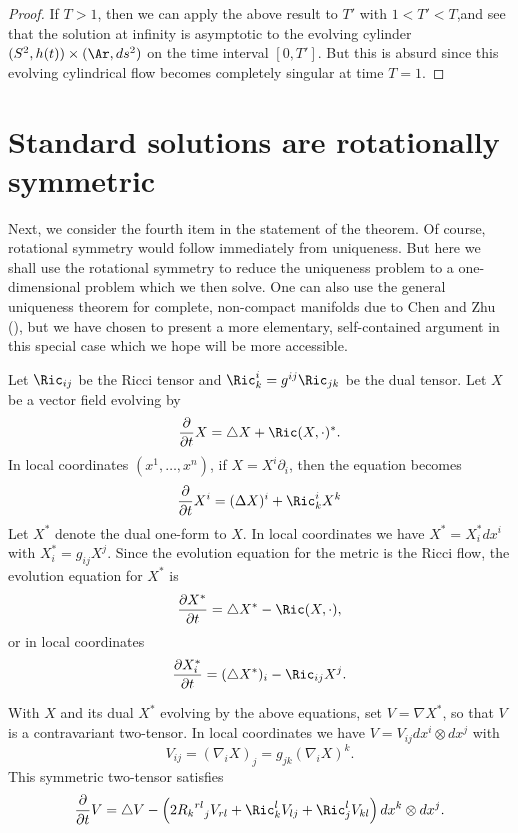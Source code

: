 \begin{proof}
If $T>1$, then we can apply the above result to $T'$ with
$1<T'<T$,and see that the solution at infinity is asymptotic to the
evolving cylinder $(S^2,h(t))\times (\Ar,ds^2)$ on the time interval
$[0,T']$. But this is absurd since this evolving cylindrical flow
becomes completely singular at time $T=1$.
\end{proof}







\section{Standard solutions are rotationally symmetric}

Next, we consider the fourth item in the statement of the theorem.
Of course, rotational symmetry would follow immediately from
uniqueness. But here we shall use the rotational symmetry to reduce
the uniqueness problem to a one-dimensional problem which we then
solve. One can also use the general uniqueness theorem for complete,
non-compact manifolds due to Chen and Zhu (\cite{ChenZhu}), but we
have chosen to present a more elementary, self-contained argument in
this special case which we hope will be more accessible.

Let $\Ric_{ij}$ be the Ricci tensor and $\Ric^i_k= g^{ij}
\Ric_{jk}$ be the dual tensor. Let $X$ be a vector field
evolving by
\begin{equation}\label{eq1}\frac{\partial}{\partial t}X=\triangle X+\Ric(X,\cdot)^*.
\end{equation}
 In local coordinates $(x^1,\ldots,x^n)$, if
 $X=X^i\partial_i$, then the equation becomes
\begin{equation}
\frac{\partial}{\partial t}X^{i}=(\Delta X)^{i}+\Ric_{k}^{i}X^{k} \label{eq.3}
\end{equation}
Let $X^*$ denote the dual one-form to $X$. In local coordinates we
have $X^*=X^*_idx^i$ with $X^*_i=g_{ij}X^j$. Since the evolution
equation for the metric is the Ricci flow, the evolution equation
for $X^*$ is
$$\frac{\partial X^*}{\partial t}=\triangle X^*-\Ric(X,\cdot),$$
or in local coordinates
$$\frac{\partial X^*_i}{\partial t}=(\triangle X^*)_i-\Ric_{ij}X^j.$$

\begin{lemma}[Evolution of $V=\nabla X^*$]
\label{lem:v-tensor-evolution}
\label{12.9}
With $X$ and its dual $X^*$ evolving by the above equations, set
$V=\nabla X^*$, so that $V$ is a contravariant two-tensor. In local
coordinates we have $V=V_{ij}dx^i\otimes dx^j$ with
$$V_{ij}=(\nabla_iX)_j=g_{jk}(\nabla_iX)^k.$$
This symmetric two-tensor satisfies
\begin{equation}
\frac{\partial}{\partial t}V=\triangle
V-\left(2{{R_k}^{rl}}_jV_{rl}+\Ric_k^lV_{lj} +\Ric_j^lV_{kl}\right)dx^k\otimes dx^j. \label{eq.4}
\end{equation}
\end{lemma}

